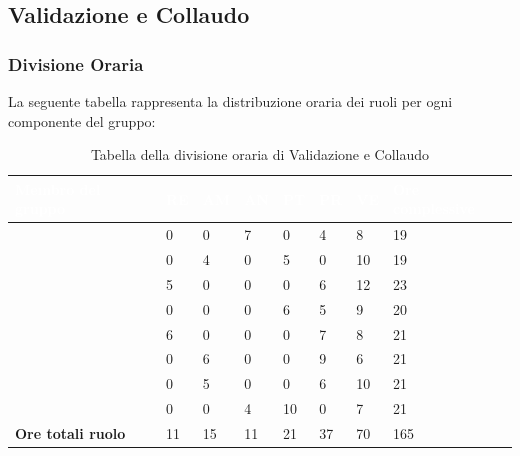 \subsection{Validazione e Collaudo}

\subsubsection{Divisione Oraria}
La seguente tabella rappresenta la distribuzione oraria dei ruoli per ogni componente del gruppo:
{
\renewcommand{\arraystretch}{2}
\centering
\begin{longtable}[h!] { C{4cm} C{1cm} C{1cm} C{1cm} C{1cm} C{1cm} C{1cm} C{3cm}}
\caption{Tabella della divisione oraria di Validazione e Collaudo}\\

\textcolor{white}{\textbf{Membro del gruppo}} & 
\textcolor{white}{\textbf{RE}} & 
\textcolor{white}{\textbf{AM}} & 
\textcolor{white}{\textbf{AN}} & 
\textcolor{white}{\textbf{PT}} & 
\textcolor{white}{\textbf{PR}} &
\textcolor{white}{\textbf{VE}} &
\textcolor{white}{\textbf{Ore complessive}}\\	
\endhead
        
\MC{}                     &  0 &  0 &  7 &  0 &  4 &  8 &  19 \\
\LD{}                     &  0 &  4 &  0 &  5 &  0 & 10 &  19 \\
\CE{}                     &  5 &  0 &  0 &  0 &  6 & 12 &  23 \\ 
\SE{}                     &  0 &  0 &  0 &  6 &  5 &  9 &  20 \\
\PF{}                     &  6 &  0 &  0 &  0 &  7 &  8 &  21 \\
\DF{}                     &  0 &  6 &  0 &  0 &  9 &  6 &  21 \\
\BR{}                     &  0 &  5 &  0 &  0 &  6 & 10 &  21 \\
\AT{}                     &  0 &  0 &  4 & 10 &  0 &  7 &  21 \\
\textbf{Ore totali ruolo} & 11 & 15 & 11 & 21 & 37 & 70 & 165 \\
		
\end{longtable}
}


